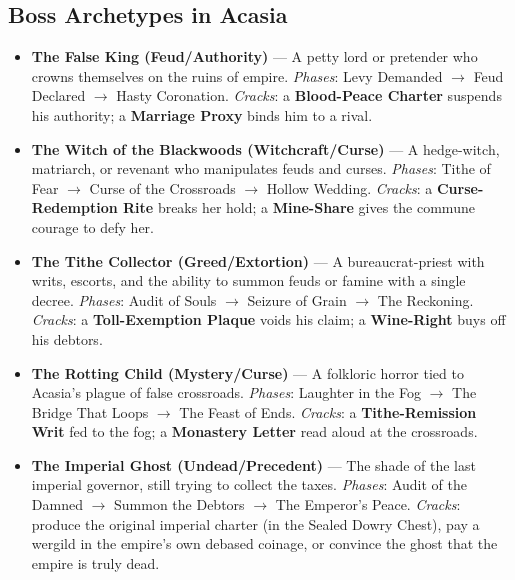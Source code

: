 \subsection*{Boss Archetypes in Acasia}
\label{sec:acasia-bosses}
\begin{itemize}
\item \textbf{The False King (Feud/Authority)} --- A petty lord or pretender who crowns themselves on the ruins of empire. \emph{Phases}: Levy Demanded $\rightarrow$ Feud Declared $\rightarrow$ Hasty Coronation. \emph{Cracks}: a \textbf{Blood-Peace Charter} suspends his authority; a \textbf{Marriage Proxy} binds him to a rival.
\item \textbf{The Witch of the Blackwoods (Witchcraft/Curse)} --- A hedge-witch, matriarch, or revenant who manipulates feuds and curses. \emph{Phases}: Tithe of Fear $\rightarrow$ Curse of the Crossroads $\rightarrow$ Hollow Wedding. \emph{Cracks}: a \textbf{Curse-Redemption Rite} breaks her hold; a \textbf{Mine-Share} gives the commune courage to defy her.
\item \textbf{The Tithe Collector (Greed/Extortion)} --- A bureaucrat-priest with writs, escorts, and the ability to summon feuds or famine with a single decree. \emph{Phases}: Audit of Souls $\rightarrow$ Seizure of Grain $\rightarrow$ The Reckoning. \emph{Cracks}: a \textbf{Toll-Exemption Plaque} voids his claim; a \textbf{Wine-Right} buys off his debtors.
\item \textbf{The Rotting Child (Mystery/Curse)} --- A folkloric horror tied to Acasia's plague of false crossroads. \emph{Phases}: Laughter in the Fog $\rightarrow$ The Bridge That Loops $\rightarrow$ The Feast of Ends. \emph{Cracks}: a \textbf{Tithe-Remission Writ} fed to the fog; a \textbf{Monastery Letter} read aloud at the crossroads.
\item \textbf{The Imperial Ghost (Undead/Precedent)} --- The shade of the last imperial governor, still trying to collect the taxes. \emph{Phases}: Audit of the Damned $\rightarrow$ Summon the Debtors $\rightarrow$ The Emperor's Peace. \emph{Cracks}: produce the original imperial charter (in the Sealed Dowry Chest), pay a wergild in the empire's own debased coinage, or convince the ghost that the empire is truly dead.
\end{itemize}

